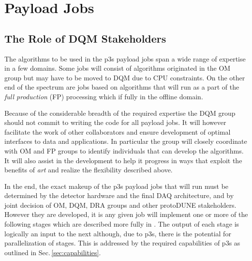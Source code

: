 \documentclass[pdftex,12pt,letter]{article}
\newcommand{\pd}{protoDUNE\xspace}
\begin{document}
\section{Payload Jobs}
\label{sec:categories}

\subsection{The Role of DQM Stakeholders}
The algorithms to be used in the p3s payload jobs span a wide
range of expertise in a few domains.  Some jobs will consist of algorithms
originated in the OM group but may have to be moved to DQM due
to CPU constraints. On the other end of the spectrum
are jobs based on algorithms that will run as a part
of the \textit{full production} (FP) processing which if fully in the
offline domain.

Because of the considerable breadth of the required expertise the
DQM group should not commit to writing the code for all payload jobs. 
It will however facilitate the work of other
collaborators and ensure development of optimal interfaces
to data and applications.  In particular the group will closely
coordinate with OM and FP groups to identify individuals that can
develop the algorithms.  It will also assist in the development to
help it progress in ways that exploit the benefits of \textit{art} and
realize the flexibility described above.

In the end, the exact makeup of the p3s payload jobs that will run
must be determined by the detector hardware and the final DAQ
architecture, and by joint decision of OM, DQM, DRA groups and
other \pd  stakeholders.  However they are
developed, it is any given job will implement one or more of the
following stages which are described more fully in \cite{docdb1811}.
The output of each stage is logically an input to the next although,
due to p3s, there is the potential for parallelization of stages. This is
addressed by the required capabilities of p3s as outlined in
Sec.\,\ref{sec:capabilities}.
\end{document}
